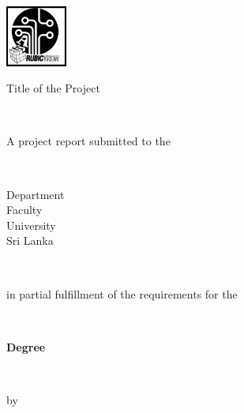 
\thispagestyle{empty}

\begin{center}

\begin{center}
 \includegraphics[width=2cm,keepaspectratio=true]{./00_cover/_Rubictron.jpg}
\end{center}

\vspace{1.5cm}
\begin{huge}
Title of the Project
\end{huge} \\
\vspace{1cm}

\begin{normalsize}
A project report submitted to the
\end{normalsize}\\
\vspace{1cm}

\begin{large}
Department\\
Faculty\\
University\\
Sri Lanka
\end{large}\\

\vspace{1cm}

\begin{normalsize}in partial fulfillment of the requirements for the \end{normalsize}\\
\vspace{1cm}

\begin{large}\textbf{Degree}\end{large}\\

\vspace{1cm}
\begin{normalsize}by  \end{normalsize}
\vspace{1cm}


\end{center}
